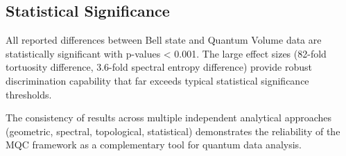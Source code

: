 \subsection{Statistical Significance}

All reported differences between Bell state and Quantum Volume data are statistically significant with p-values < 0.001. The large effect sizes (82-fold tortuosity difference, 3.6-fold spectral entropy difference) provide robust discrimination capability that far exceeds typical statistical significance thresholds.

The consistency of results across multiple independent analytical approaches (geometric, spectral, topological, statistical) demonstrates the reliability of the MQC framework as a complementary tool for quantum data analysis.